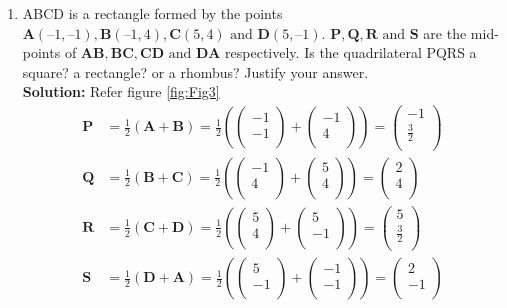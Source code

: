 \documentclass[12pt]{article}
\providecommand{\brak}[1]{\ensuremath{\left(#1\right)}}
\newcommand{\solution}{\noindent \textbf{Solution: }}
\newcommand{\myvec}[1]{\ensuremath{\begin{pmatrix}#1\end{pmatrix}}}
\let\vec\mathbf
\begin{document}
\begin{enumerate}
\item ABCD is a rectangle formed by the points $\vec{A}(–1, –1), \vec{B}(– 1, 4), \vec{ C}(5, 4) \text{ and } \vec{D}(5, – 1)$. $\vec{P,Q,R} \text{ and } \vec{S}$ are the mid-points of $\vec{AB, BC, CD} \text{ and } \vec{DA}$ respectively. Is the quadrilateral
PQRS a square? a rectangle? or a rhombus? Justify your answer. \\
\solution 
Refer figure \ref{fig:Fig3}
\begin{align}
  \label{eq:det2f}
  \vec{P} &= \frac{1}{2}\brak{\vec{A}+\vec{B}} =   \frac{1}{2}\brak{\myvec{
  -1 \\
  -1 \\
 } + \myvec{
  -1 \\
  4 \\
 } 
 } = \myvec{
 -1 \\
 \frac{3}{2} \\
 }   \\
 \vec{Q} &= \frac{1}{2}\brak{\vec{B}+\vec{C}} =   \frac{1}{2}\brak{\myvec{
  -1 \\
  4 \\
 } + \myvec{
  5 \\
  4 \\
 } 
 } = \myvec{
 2 \\
 4 \\
 }   \\
 \vec{R} &= \frac{1}{2}\brak{\vec{C}+\vec{D}} =   \frac{1}{2}\brak{\myvec{
  5 \\
  4 \\
 } + \myvec{
  5 \\
  -1\\
 } 
 } = \myvec{
 5 \\
 \frac{3}{2} \\
 }   \\
 \vec{S} &= \frac{1}{2}\brak{\vec{D}+\vec{A}} =   \frac{1}{2}\brak{\myvec{
  5 \\
  -1 \\
 } + \myvec{
  -1 \\
  -1\\
 } 
 } = \myvec{
 2\\
 -1 \\
 }   \\
\end{align}


\end{enumerate}
\end{document}
